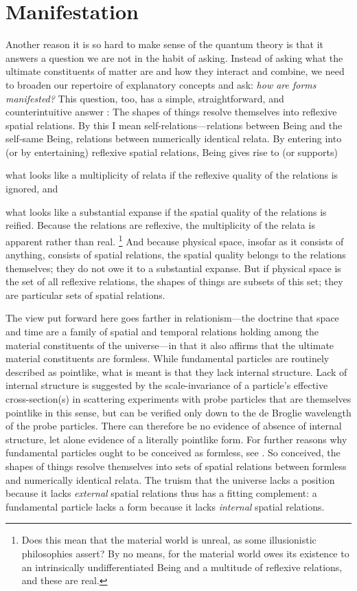 \section{Manifestation}\label{Manifestation}
Another reason it is so hard to make sense of the quantum theory is that it answers a question we are not in the habit of asking. Instead of asking what the ultimate constituents of matter are and how they interact and combine, we need to broaden our repertoire of explanatory concepts and ask: \emph{how are forms manifested?} This question, too, has a simple, straightforward, and counterintuitive  answer \citep[Sec.~9]{Mohrhoff2014}: The shapes of things resolve themselves into reflexive spatial relations. By this I mean self-relations---relations between Being and the self-same Being, relations between numerically identical relata. By entering into (or by entertaining) reflexive spatial relations, Being gives rise to (or supports)
\ben
\item what looks like a multiplicity of relata if the reflexive quality of the relations is ignored, and 
\item what looks like a substantial expanse if the spatial quality of the relations is reified.
\een
Because the relations are reflexive, the multiplicity of the relata is apparent rather than real.%
\footnote{Does this mean that the material world is unreal, as some illusionistic philosophies assert? By no means, for the material world owes its existence to an intrinsically undifferentiated Being and a multitude of reflexive relations, and these are real.}
And because physical space, insofar as it consists of anything, consists of spatial relations, the spatial quality belongs to the relations themselves; they do not owe it to a substantial expanse. But if physical space is the set of all reflexive relations, the shapes of things are subsets of this set; they are particular sets of spatial relations.

The view put forward here goes farther in relationism---the doctrine that space and time are a family of spatial and temporal relations holding among the material constituents of the universe---in that it also affirms that the ultimate material constituents are formless. While fundamental particles are routinely described as pointlike, what is meant is that they lack internal structure. Lack of internal structure is suggested by the scale-invariance of a particle's effective cross-section(s) in scattering experiments with probe particles that are themselves pointlike in this sense, but can be verified only down to the de Broglie wavelength of the probe particles. There can therefore be no evidence of absence of internal structure, let alone evidence of a literally pointlike form. For further reasons why fundamental particles ought to be conceived as formless, see \citep[Sect.~9]{Mohrhoff2014}. So conceived, the shapes of things resolve themselves into sets of spatial relations between formless and numerically identical relata. The truism that the universe lacks a position because it lacks \emph{external} spatial relations thus has a fitting complement: a fundamental particle lacks a form because it lacks \emph{internal} spatial relations.

